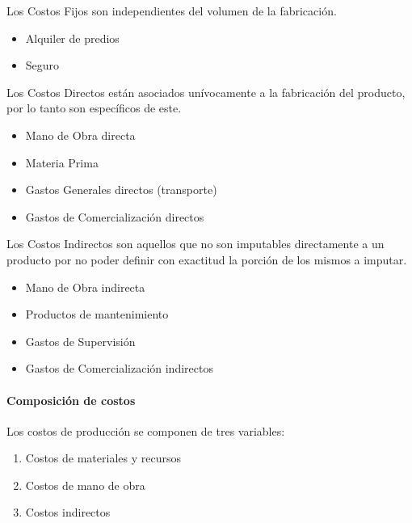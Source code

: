 \documentclass[letterpaper,10pt,spanish]{sphinxmanual}
\begin{document}
Los Costos Fijos son independientes del volumen de la fabricación.
\begin{itemize}
\item {} 
Alquiler de predios

\item {} 
Seguro

\end{itemize}

Los Costos Directos están asociados unívocamente a la fabricación del producto, por lo tanto son específicos de este.
\begin{itemize}
\item {} 
Mano de Obra directa

\item {} 
Materia Prima

\item {} 
Gastos Generales directos (transporte)

\item {} 
Gastos de Comercialización directos

\end{itemize}

Los Costos Indirectos son aquellos que no son imputables directamente a un producto por no poder definir con exactitud la porción de los mismos a imputar.
\begin{itemize}
\item {} 
Mano de Obra indirecta

\item {} 
Productos de mantenimiento

\item {} 
Gastos de Supervisión

\item {} 
Gastos de Comercialización indirectos

\end{itemize}


\paragraph{Composición de costos}
\label{manufactura-costos-conceptos:composicion-de-costos}
Los costos de producción se componen de tres variables:
\begin{enumerate}
\item {} 
Costos de materiales y recursos

\item {} 
Costos de mano de obra

\item {} 
Costos indirectos

\end{enumerate}
\end{document}
